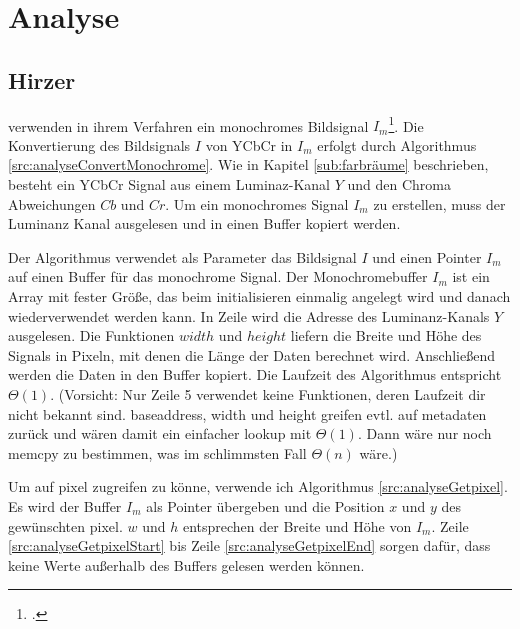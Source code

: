 \section{Analyse} %
\label{sec:analyse}
\begin{comment}
	Detailierte Beschreibung der Algorithmen inkl. O-Notation (Nitty-Gritty Darstellung der Algos)
	1. ARToolKit
	2. ARToolKitPlus
	3. Zissermann/Clarke
	Analyse: Die auswertung nach den Kriterein aus Kap. Vorgehen OHNE WERTUNG! Nur die Daten erheben und auswerten.
\end{comment}

\subsection{Hirzer} %
\label{sub:hirzer}

\citeauthor{clarke96} verwenden in ihrem Verfahren ein monochromes Bildsignal $I_m$\footcite[Vgl.][S.~417]{clarke96}.
 Die Konvertierung des Bildsignals $I$ von YCbCr in $I_m$ erfolgt durch Algorithmus \ref{src:analyseConvertMonochrome}.
 Wie in Kapitel \ref{sub:farbräume} beschrieben, besteht ein YCbCr Signal aus einem Luminaz-Kanal $Y$ und den Chroma
 Abweichungen $Cb$ und $Cr$. Um ein monochromes Signal $I_m$ zu erstellen, muss der Luminanz Kanal ausgelesen und in
 einen Buffer kopiert werden.



Der Algorithmus verwendet als Parameter das Bildsignal $I$ und einen Pointer $I_m$ auf einen Buffer für das monochrome
 Signal. Der Monochromebuffer $I_m$ ist ein Array mit fester Größe, das beim initialisieren einmalig angelegt wird und
 danach wiederverwendet werden kann. In Zeile
  wird die Adresse des Luminanz-Kanals
 $Y$ ausgelesen. Die Funktionen $width$ und $height$ liefern die Breite und Höhe des Signals in Pixeln, mit denen die
 Länge der Daten berechnet wird. Anschließend werden die Daten in den Buffer kopiert. Die Laufzeit des Algorithmus
 entspricht $\Theta(1)$. (Vorsicht: Nur Zeile 5 verwendet keine Funktionen, deren Laufzeit dir nicht bekannt sind.
 baseaddress, width und height greifen evtl. auf metadaten zurück und wären damit ein einfacher lookup mit $\Theta(1)$.
 Dann wäre nur noch memcpy zu bestimmen, was im schlimmsten Fall $\Theta(n)$ wäre.)

Um auf \gls{pixel} zugreifen zu könne, verwende ich Algorithmus \ref{src:analyseGetpixel}. Es wird der Buffer $I_m$ als
 Pointer übergeben und die Position $x$ und $y$ des gewünschten \gls{pixel}. $w$ und $h$ entsprechen der Breite und
 Höhe von $I_m$. Zeile \ref{src:analyseGetpixelStart} bis Zeile \ref{src:analyseGetpixelEnd} sorgen dafür, dass keine
 Werte außerhalb des Buffers gelesen werden können.

